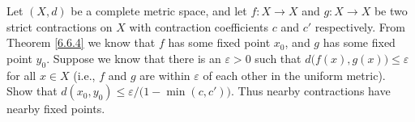 \begin{exercise}\label{ex 6.6.8}
    Let \((X, d)\) be a complete metric space, and let \(f : X \to X\) and \(g : X \to X\) be two strict contractions on \(X\) with contraction coefficients \(c\) and \(c'\) respectively.
    From Theorem \ref{6.6.4} we know that \(f\) has some fixed point \(x_0\), and \(g\) has some fixed point \(y_0\).
    Suppose we know that there is an \(\varepsilon > 0\) such that \(d\big(f(x), g(x)\big) \leq \varepsilon\) for all \(x \in X\)
    (i.e., \(f\) and \(g\) are within \(\varepsilon\) of each other in the uniform metric).
    Show that \(d(x_0, y_0) \leq \varepsilon / \big(1 - \min(c, c')\big)\).
    Thus nearby contractions have nearby fixed points.
\end{exercise}